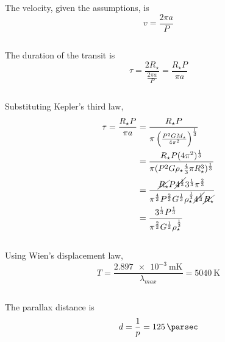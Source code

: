 \documentclass{article}
\begin{document}
The velocity, given the assumptions, is
\begin{equation}
    v = \frac{2 \pi a}{P}
\end{equation}

\subsection{}

The duration of the transit is
\begin{equation}
    \tau = \frac{2 R_\star}{\frac{2 \pi a}{P}} = \frac{R_\star P}{\pi a}
\end{equation}

\subsection{}

Substituting Kepler's third law,
\begin{align}
    \tau = \frac{R_\star P}{\pi a} &= \frac{R_\star P}{\pi \left(\frac{P^2 G M_\star}{4 \pi^2}\right)^{\frac{1}{3}}} \\
    &= \frac{R_\star P (4 \pi^2)^{\frac{1}{3}}}{\pi (P^2 G \rho_\star \frac{4}{3} \pi R_\star^3)^{\frac{1}{3}}} \\
    &= \frac{\cancel{R_\star} P \cancel{4^{\frac{1}{3}}} 3^{\frac{1}{3}} \pi^{\frac{2}{3}}}{\pi^{\frac{4}{3}} P^{\frac{2}{3}} G^{\frac{1}{3}} \rho_\star^\frac{1}{3} \cancel{4^{\frac{1}{3}}} \cancel{R_\star}} \\
    &= \frac{3^{\frac{1}{3}} P^{\frac{1}{3}}}{\pi^{\frac{2}{3}} G^{\frac{1}{3}} \rho_\star^{\frac{1}{3}}}
\end{align}

\subsection{}

Using Wien's displacement law,
\begin{equation}
    T = \frac{\SI{2.897e-3}{\meter\kelvin}}{\lambda_{max}} = \SI{5040}{\kelvin}
\end{equation}

\subsection{}

The parallax distance is
\begin{equation}
    d = \frac{1}{p} = \SI{125}{\parsec}
\end{equation}
\end{document}
